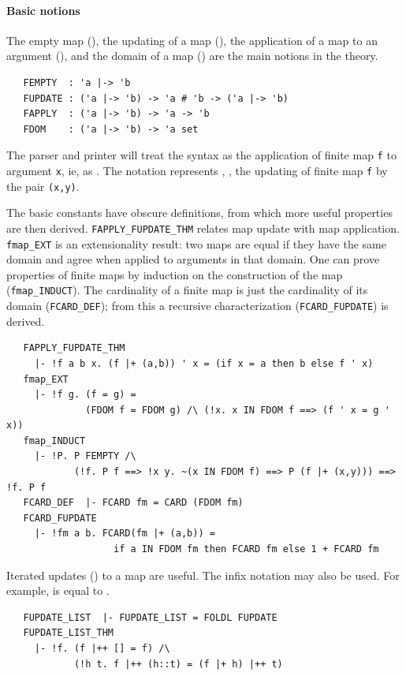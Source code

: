 {\paragraph {Basic notions}

The empty map (), the updating of a map
(), the application of a map to an argument
(), and the domain of a map () are the
main notions in the theory.
\begin{hol}
\begin{verbatim}
   FEMPTY  : 'a |-> 'b
   FUPDATE : ('a |-> 'b) -> 'a # 'b -> ('a |-> 'b)
   FAPPLY  : ('a |-> 'b) -> 'a -> 'b
   FDOM    : ('a |-> 'b) -> 'a set
\end{verbatim}
\end{hol}

The \HOL{} parser and printer will treat the syntax  as
the application of finite map \verb+f+ to argument \verb+x+, ie, as
. The notation  represents
, \ie, the updating of finite map
\verb+f+ by the pair \verb+(x,y)+.

The basic constants have obscure definitions, from which more useful
properties are then derived. {\small\verb+FAPPLY_FUPDATE_THM+} relates
map update with map application.  {\small\verb+fmap_EXT+} is an
extensionality result: two maps are equal if they have the same domain
and agree when applied to arguments in that domain. One can prove
properties of finite maps by induction on the construction of the map
({\small\verb+fmap_INDUCT+}).  The cardinality of a finite map is
just the cardinality of its domain ({\small\verb+FCARD_DEF+}); from
this a recursive characterization ({\small\verb+FCARD_FUPDATE+}) is
derived.
\begin{hol}
\begin{verbatim}
   FAPPLY_FUPDATE_THM
     |- !f a b x. (f |+ (a,b)) ' x = (if x = a then b else f ' x)
   fmap_EXT
     |- !f g. (f = g) =
              (FDOM f = FDOM g) /\ (!x. x IN FDOM f ==> (f ' x = g ' x))
   fmap_INDUCT
     |- !P. P FEMPTY /\
            (!f. P f ==> !x y. ~(x IN FDOM f) ==> P (f |+ (x,y))) ==> !f. P f
   FCARD_DEF  |- FCARD fm = CARD (FDOM fm)
   FCARD_FUPDATE
     |- !fm a b. FCARD(fm |+ (a,b)) =
                   if a IN FDOM fm then FCARD fm else 1 + FCARD fm
\end{verbatim}
\end{hol}
Iterated updates () to a map are useful. The
infix notation \holtxt{|++} may also be used.  For example,  is equal to .
\begin{hol}
\begin{verbatim}
   FUPDATE_LIST  |- FUPDATE_LIST = FOLDL FUPDATE
   FUPDATE_LIST_THM
     |- !f. (f |++ [] = f) /\
            (!h t. f |++ (h::t) = (f |+ h) |++ t)
\end{verbatim}
\end{hol}


}
